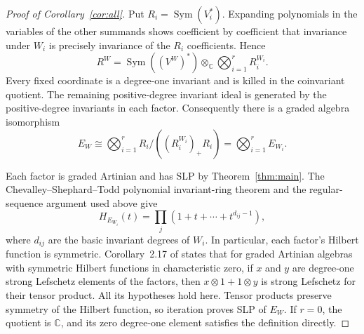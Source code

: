 \documentclass[11pt]{article}
\theoremstyle{definition}
\newcommand{\C}{\mathbb C}
\newcommand{\Sym}{\operatorname{Sym}}
\begin{document}
\begin{appendices}
\begin{proof}[Proof of Corollary~\ref{cor:all}]
Put $R_i=\Sym(V_i^*)$. Expanding polynomials in the variables of the
other summands shows coefficient by coefficient that invariance under
$W_i$ is precisely invariance of the $R_i$ coefficients. Hence
\[
 R^W=\Sym((V^W)^*)\otimes_\C\bigotimes_{i=1}^r R_i^{W_i}.
\]
Every fixed coordinate is a degree-one invariant and is killed in the
coinvariant quotient. The remaining positive-degree invariant ideal is
generated by the positive-degree invariants in each factor. Consequently
there is a graded algebra isomorphism
\[
 E_W\cong\bigotimes_{i=1}^r
                R_i/((R_i^{W_i})_+R_i)
           =\bigotimes_{i=1}^r E_{W_i}.
\]

Each factor is graded Artinian and has SLP by
Theorem~\ref{thm:main}. The Chevalley--Shephard--Todd polynomial invariant-ring theorem
\cite[Theorem~3]{WachiLecture} and the regular-sequence argument used
above give
\[
 H_{E_{W_i}}(t)=\prod_j(1+t+\cdots+t^{d_{ij}-1}),
\]
where $d_{ij}$ are the basic invariant degrees of $W_i$.
In particular, each factor's Hilbert function is symmetric.
Corollary~2.17 of \cite{MCCM} states that for graded Artinian algebras
with symmetric Hilbert functions in characteristic zero, if $x$ and $y$
are degree-one strong Lefschetz elements of the factors, then
$x\otimes1+1\otimes y$ is strong Lefschetz for their tensor product.
All its hypotheses hold here. Tensor products preserve symmetry of the
Hilbert function, so iteration proves SLP of $E_W$. If $r=0$, the
quotient is $\C$, and its zero degree-one element satisfies the
definition directly.
\end{proof}
\end{appendices}
\end{document}
